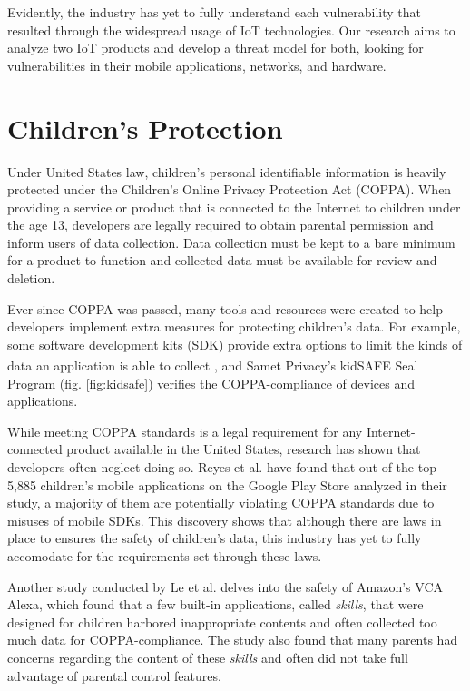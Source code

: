 \documentclass[12pt]{ucthesis}
\begin{document}
Evidently, the industry has yet to fully understand each vulnerability that resulted through the widespread usage of IoT technologies. Our research aims to analyze two IoT products and develop a threat model for both, looking for vulnerabilities in their mobile applications, networks, and hardware.

\section{Children's Protection}
Under United States law, children's personal identifiable information is heavily protected under the Children's Online Privacy Protection Act (COPPA). When providing a service or product that is connected to the Internet to children under the age 13, developers are legally required to obtain parental permission and inform users of data collection. Data collection must be kept to a bare minimum for a product to function and collected data must be available for review and deletion.

Ever since COPPA was passed, many tools and resources were created to help developers implement extra measures for protecting children's data. For example, some software development kits (SDK) provide extra options to limit the kinds of data an application is able to collect \cite{reyes:coppa}, and Samet Privacy's kidSAFE\textsuperscript{\textregistered} Seal Program (fig. \ref{fig:kidsafe}) verifies the COPPA-compliance of devices and applications.

While meeting COPPA standards is a legal requirement for any Internet-connected product available in the United States, research has shown that developers often neglect doing so. Reyes et al. \cite{reyes:coppa} have found that out of the top 5,885 children's mobile applications on the Google Play Store analyzed in their study, a majority of them are potentially violating COPPA standards due to misuses of mobile SDKs. This discovery shows that although there are laws in place to ensures the safety of children's data, this industry has yet to fully accomodate for the requirements set through these laws. 

Another study conducted by Le et al. \cite{le:skillbot} delves into the safety of Amazon's VCA Alexa, which found that a few built-in applications, called \textit{skills}, that were designed for children harbored inappropriate contents and often collected too much data for COPPA-compliance. The study also found that many parents had concerns regarding the content of these \textit{skills} and often did not take full advantage of parental control features.
\end{document}
